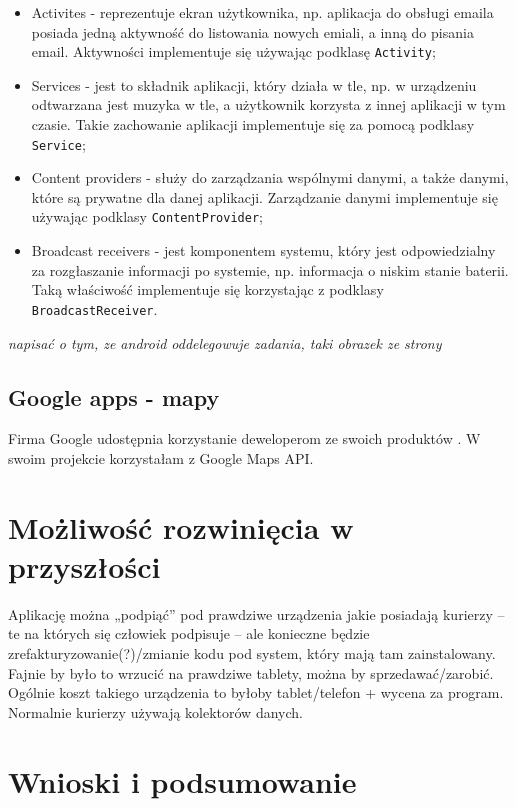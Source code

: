 \documentclass[eng,printmode,oneside]{mgr}
\begin{document}
\begin{itemize}
  \item Activites - reprezentuje ekran użytkownika, np. aplikacja do obsługi
  emaila posiada jedną aktywność do listowania nowych emiali, a inną
  do pisania email. Aktywności implementuje się używając
  podklasę \texttt{Activity};
  \item Services - jest to składnik aplikacji, który działa w tle, np. w
  urządzeniu odtwarzana jest muzyka w tle, a użytkownik korzysta z innej
  aplikacji w tym czasie. Takie zachowanie aplikacji implementuje się za pomocą
  podklasy \texttt{Service};
  \item Content providers - służy do zarządzania wspólnymi danymi, a także
  danymi, które są prywatne dla danej aplikacji. Zarządzanie danymi
  implementuje się używając podklasy \texttt{ContentProvider};
  \item Broadcast receivers - jest komponentem systemu, który jest
  odpowiedzialny za rozgłaszanie informacji po systemie, np. informacja o
  niskim stanie baterii. Taką właściwość implementuje się korzystając z podklasy
  \texttt{BroadcastReceiver}.
\end{itemize}

\emph{\color{komentarz}napisać o tym, ze android oddelegowuje zadania, taki
obrazek ze strony}

\section{Google apps - mapy}

Firma Google udostępnia korzystanie deweloperom ze swoich produktów
\cite{developer.google}. W swoim projekcie korzystałam z Google Maps API. 

\chapter{Możliwość rozwinięcia w przyszłości}
Aplikację można „podpiąć” pod prawdziwe urządzenia jakie posiadają kurierzy – te na których się człowiek podpisuje – ale konieczne będzie 
zrefakturyzowanie(?)/zmianie kodu pod system, który mają tam zainstalowany.
	Fajnie by było to wrzucić na prawdziwe tablety, można by sprzedawać/zarobić. Ogólnie koszt takiego urządzenia to byłoby tablet/telefon 
	+ wycena za program.
	Normalnie kurierzy używają kolektorów danych.

\chapter{Wnioski i podsumowanie}

\listoffigures
\listoftables
\lstlistoflistings
\end{document}
